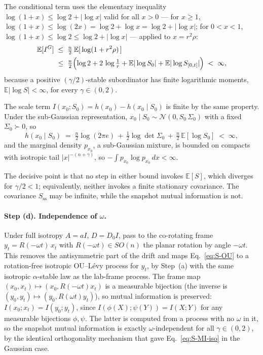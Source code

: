 \documentclass[%
 reprint,
 superscriptaddress,
 nofootinbib,
 nobibnotes,
 amsmath,amssymb,
 aps,
 prl,
 floatfix,
]{revtex4-2}
\newcommand{\Sss}{S_{\mathrm{ss}}}
\newcommand{\E}{\mathbb{E}}
\begin{document}
The conditional term uses the elementary inequality $\log(1 + x) \le \log 2 + |\log x|$ valid for all $x > 0$ --- for $x \ge 1$, $\log(1+x) \le \log(2x) = \log 2 + \log x = \log 2 + |\log x|$; for $0 < x < 1$, $\log(1+x) \le \log 2 \le \log 2 + |\log x|$ --- applied to $x = r^2 \rho$:
\begin{align*}
\E[I^{G}] \;&\le\; \tfrac{n}{2}\,\E[\,\log(1 + r^2 \rho)\,] \\
&\le\; \tfrac{n}{2}\Bigl(\log 2 + 2\,\log\tfrac{1}{r} + \E|\log S_0| + \E|\log S_{[0,t]}|\Bigr) \;<\; \infty,
\end{align*}
because a positive $(\gamma/2)$-stable subordinator has finite logarithmic moments, $\E|\log S| < \infty$, for every $\gamma \in (0, 2)$.

The scale term $I(x_0; S_0) = h(x_0) - h(x_0 \mid S_0)$ is finite by the same property. Under the sub-Gaussian representation, $x_0 \mid S_0 \sim \mathcal N(0, S_0\,\Sigma_0)$ with a fixed $\Sigma_0 \succ 0$, so
\[
h(x_0 \mid S_0) \;=\; \tfrac{n}{2}\log(2\pi e) \,+\, \tfrac{1}{2}\log\det\Sigma_0 \,+\, \tfrac{n}{2}\,\E[\log S_0] \;<\; \infty,
\]
and the marginal density $p_{x_0}$, a sub-Gaussian mixture, is bounded on compacts with isotropic tail $|x|^{-(n+\gamma)}$, so $-\int p_{x_0}\log p_{x_0}\,dx < \infty$.

The decisive point is that no step in either bound invokes $\E[S]$, which diverges for $\gamma/2 < 1$; equivalently, neither invokes a finite stationary covariance. The covariance $\Sss$ may be infinite, while the snapshot mutual information is not.

\paragraph{Step (d). Independence of $\omega$.}
Under full isotropy $A = a I$, $D = D_0 I$, pass to the co-rotating frame $y_t = R(-\omega t)\,x_t$ with $R(-\omega t) \in SO(n)$ the planar rotation by angle $-\omega t$. This removes the antisymmetric part of the drift and maps Eq.~\eqref{eq:S-OU} to a rotation-free isotropic OU--L\'evy process for $y_t$, by Step~(a) with the same isotropic $\alpha$-stable law as the lab-frame process. The frame map $(x_0, x_t) \mapsto (x_0, R(-\omega t) x_t)$ is a measurable bijection (the inverse is $(y_0, y_t) \mapsto (y_0, R(\omega t) y_t)$), so mutual information is preserved: $I(x_0; x_t) = I(y_0; y_t)$, since $I(\phi(X); \psi(Y)) = I(X; Y)$ for any measurable bijections $\phi, \psi$. The latter is computed from a process with no $\omega$ in it, so the snapshot mutual information is exactly $\omega$-independent for all $\gamma \in (0, 2)$, by the identical orthogonality mechanism that gave Eq.~\eqref{eq:S-MI-iso} in the Gaussian case.
\end{document}
